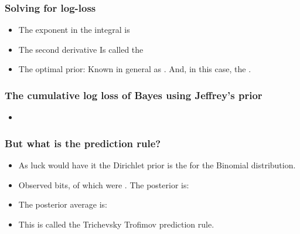 \documentclass{beamer}
\begin{document}
\begin{frame}
\frametitle{Solving for log-loss}
\begin{itemize}
\item
The exponent in the integral is
\R{\[
g(\btheta,\theta) - g(\btheta,\btheta)
=
\btheta \ln {\btheta \over \theta} + 
(1-\btheta) \ln {1-\btheta \over 1-\theta}
=
D_{KL} (\btheta || \theta)
\]}
\item
The second derivative
\R{\[
\left. {d^2 \over d\theta^2} \right|_{\theta=\btheta} 
D_{KL} (\btheta || \theta) = \btheta (1-\btheta)
\]}
Is called the 
\item
The optimal prior:
\R{\[
\dweight{\btheta}{*} = \frac{1}{\pi \sqrt{\btheta (1-\btheta)}}
\]}
Known in general as .  And, in this case, 
the .
\end{itemize}
\end{frame}

\begin{frame}
\frametitle{The cumulative log loss of Bayes using Jeffrey's prior}
\begin{itemize}
\item
{}
\end{itemize}
\end{frame}

\begin{frame}
\frametitle{But what is the prediction rule?}
\begin{itemize}
\item As luck would have it the Dirichlet prior is the  for the Binomial distribution.
\item
Observed  bits,  of which were . The posterior is:
\R{\[
\frac{1}{Z \sqrt{\theta(1-\theta)}} \theta^n (1-\theta)^{t-n} 
 = 
\frac{1}{Z} \theta^{n-1/2} (1-\theta)^{t-n-1/2} 
\]}
\item
The posterior average is:
\R{\[
\frac{\int_0^1 \theta^{n+1/2} (1-\theta)^{t-n-1/2} d\theta}
{\int_0^1 \theta^{n-1/2} (1-\theta)^{t-n-1/2} d\theta}
=
\frac{n+1/2}{t+1}
\]}
\item This is called the Trichevsky Trofimov prediction rule.
\end{itemize}
\end{frame}
\end{document}
